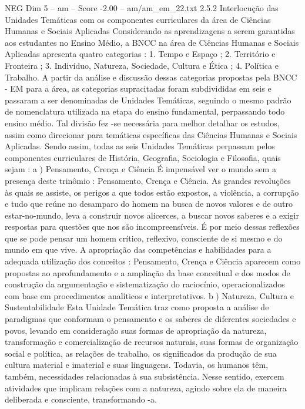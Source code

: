 \begin{textsample}{NEG Dim 5 – am – Score -2.00 – am/am\_em\_22.txt}  \label{ex:f5_neg_222}
2.5.2 Interlocução das Unidades Temáticas com os componentes curriculares da área de Ciências Humanas e Sociais Aplicadas Considerando as aprendizagens a serem garantidas aos estudantes no Ensino Médio, a BNCC na área de Ciências Humanas e Sociais Aplicadas apresenta quatro categorias : 1.
Tempo e Espaço ; 2.
Território e Fronteira ; 3.
Indivíduo, Natureza, Sociedade, Cultura e Ética ; 4.
Política e Trabalho.
A partir da análise e discussão dessas categorias propostas pela BNCC - EM para a área, as categorias supracitadas foram subdivididas em seis e passaram a ser denominadas de Unidades Temáticas, seguindo o mesmo padrão de nomenclatura utilizada na etapa do ensino fundamental, perpassando todo ensino médio.
Tal divisão fez -se necessária para melhor detalhar os estudos, assim como direcionar para temáticas específicas das Ciências Humanas e Sociais Aplicadas.
Sendo assim, todas as seis Unidades Temáticas perpassam pelos componentes curriculares de História, Geografia, Sociologia e Filosofia, quais sejam : a ) Pensamento, Crença e Ciência É impensável ver o mundo sem a presença deste trinômio : Pensamento, Crença e Ciência.
As grandes revoluções às quais se assiste, os perigos a que todos estão expostos, a violência, a corrupção e tudo que reúne no desamparo do homem na busca de novos valores e de outro estar-no-mundo, leva a construir novos alicerces, a buscar novos saberes e a exigir respostas para questões que nos são incompreensíveis.
É por meio dessas reflexões que se pode pensar um homem crítico, reflexivo, consciente de si mesmo e do mundo em que vive.
A apropriação das competências e habilidades para a adequada utilização dos conceitos : Pensamento, Crença e Ciência aparecem como propostas ao aprofundamento e a ampliação da base conceitual e dos modos de construção da argumentação e sistematização do raciocínio, operacionalizados com base em procedimentos analíticos e interpretativos. b ) Natureza, Cultura e Sustentabilidade Esta Unidade Temática traz como proposta a análise de paradigmas que conformam o pensamento e os saberes de diferentes sociedades e povos, levando em consideração suas formas de apropriação da natureza, transformação e comercialização de recursos naturais, suas formas de organização social e política, as relações de trabalho, os significados da produção de sua cultura material e imaterial e suas linguagens.
Todavia, os humanos têm, também, necessidades relacionadas à sua subsistência.
Nesse sentido, exercem atividades que implicam relações com a natureza, agindo sobre ela de maneira deliberada e consciente, transformando -a.

\end{textsample}
